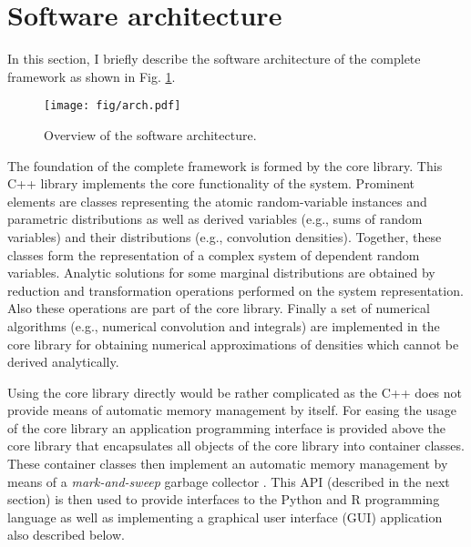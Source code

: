 \section{Software architecture}
In this section, I briefly describe the software architecture of the complete  framework as shown in Fig. \ref{fig:arch}. 

\begin{figure} [!ht]
 \centering
 \texttt{[image: fig/arch.pdf]}
 \caption{Overview of the  software architecture.} \label{fig:arch}
\end{figure}

The foundation of the complete framework is formed by the  core library. This C++ library implements the core functionality of the system. Prominent elements are classes representing the atomic random-variable instances and parametric distributions as well as derived variables (e.g., sums of random variables) and their distributions (e.g., convolution densities).  Together, these classes form the representation of a complex system of dependent random variables. Analytic solutions for some marginal distributions are obtained by reduction and transformation operations performed on the system representation. Also these operations are part of the core library. Finally a set of numerical algorithms (e.g., numerical convolution and integrals) are implemented in the core library for obtaining numerical approximations of densities which cannot be derived analytically. 

Using the core library directly would be rather complicated as the C++ does not provide means of automatic memory management by itself. For easing the usage of the core library an application programming interface is provided above the core library that encapsulates all objects of the core library into container classes. These container classes then implement an automatic memory management by means of a \emph{mark-and-sweep} garbage collector \cite[e.g.,][]{Aho2007}. This API (described in the next section) is then used to provide interfaces to the Python and R programming language as well as implementing a graphical user interface (GUI) application also described below.